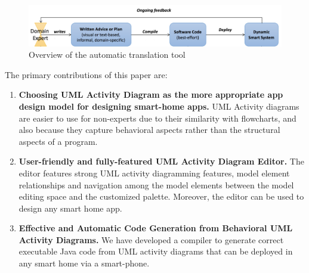\begin{figure}[!ht]
	\includegraphics[width=\textwidth]{figs/Proposed_Solution}
	\caption{Overview of the automatic translation tool}
	\label{figure:solution}
\end{figure}


The primary contributions of this paper are:

\begin{enumerate}
\item \textbf{Choosing UML Activity Diagram as the more appropriate app design model for designing smart-home apps.} UML Activity diagrams are easier to use for non-experts due to their similarity with flowcharts, and also because they capture behavioral aspects rather than the structural aspects of a program. 

\item \textbf{User-friendly and fully-featured UML Activity Diagram Editor.} The editor features strong UML activity diagramming features, model element relationships and navigation among the model elements between the model editing space and the customized palette. Moreover, the editor can be used to design any smart home app. 

\item \textbf{Effective and Automatic Code Generation from Behavioral UML Activity Diagrams.} We have developed a compiler to generate correct executable Java code from UML activity diagrams that can be deployed in any smart home via a smart-phone.


\end{enumerate}






